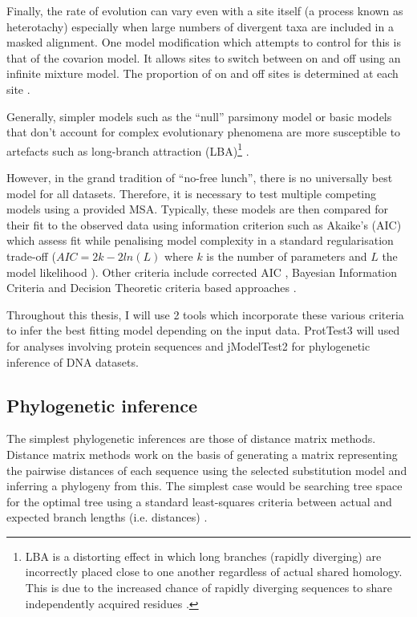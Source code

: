 Finally, the rate of evolution can vary even with a site itself (a process 
known as heterotachy) especially when large numbers of divergent taxa are included
in a masked alignment.  One model modification which attempts to control 
for this is that of the covarion model.  It allows sites to switch between
on and off using an infinite mixture model.  The proportion of on and off sites
is determined at each site \citep{Zhou2010}.



Generally, simpler models such as the ``null'' parsimony model or basic models
that don't account for complex evolutionary phenomena are more susceptible to
artefacts such as long-branch attraction (LBA)\footnote{
    LBA is a distorting effect in which long branches (rapidly diverging)
    are incorrectly placed close to one another regardless of actual shared
    homology.  This is due to the increased chance of rapidly diverging sequences
to share independently acquired residues \citep{Bergsten2005}.}
\citep{Yang1996}.

However, in the grand tradition of
``no-free lunch'', there is no universally best model for all datasets.
Therefore, it is necessary to test multiple competing models using a provided
MSA.  Typically, these models are then compared for their fit to the observed
data using information criterion \citep{Sullivan2005} such as Akaike's (AIC) which assess
fit while penalising model complexity in a standard regularisation trade-off 
(\(AIC=2k-2ln(L)\) where \(k\) is the number of parameters and \(L\) the 
model likelihood \citep{Akaike1974}).  Other criteria include corrected AIC \citep{sugiura1978further},
Bayesian Information Criteria \citep{Schwarz1978} and Decision Theoretic criteria \citep{Minin2003} 
based approaches \citep{Sullivan2005}.

Throughout this thesis, I will use 2 tools which incorporate these various criteria
to infer the best fitting model depending on the input data. 
ProtTest3 \citep{Abascal2005,Darriba2011c} will used for analyses 
involving protein sequences and jModelTest2 \citep{Posada2008,Darriba2012} for
phylogenetic inference of DNA datasets.

\subsection{Phylogenetic inference}

The simplest phylogenetic inferences are those of distance matrix methods.
Distance matrix methods \citep{Fitch1967} work on the basis of generating 
a matrix representing the pairwise distances of each sequence using the selected
substitution model and inferring a phylogeny from this.  The simplest case
would be searching tree space for the optimal tree using a standard least-squares
criteria between actual and expected branch lengths (i.e. distances) \citep{Fitch1967,Cavalli-Sforza1967}.

